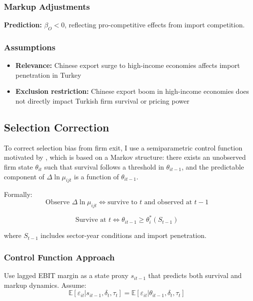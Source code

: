 \documentclass[12pt]{article}
\begin{document}
\subsubsection{Markup Adjustments}

\textbf{Prediction:} $\beta_O < 0$, reflecting pro-competitive effects from import competition.

\subsubsection{Assumptions}

\begin{itemize}
    \item \textbf{Relevance:} Chinese export surge to high-income economies affects import penetration in Turkey
    \item \textbf{Exclusion restriction:} Chinese export boom in high-income economies does not directly impact Turkish firm survival or pricing power
\end{itemize}

\subsection{Selection Correction}

To correct selection bias from firm exit, I use a semiparametric control function motivated by \autocite{backusWhyProductivityCorrelated2020}, which is based on a Markov structure: there exists an unobserved firm state $\theta_{it}$ such that survival follows a threshold in $\theta_{it-1}$, and the predictable component of $\Delta \ln \mu_{ijt}$ is a function of $\theta_{it-1}$.

Formally:
\[
\text{Observe } \Delta \ln \mu_{ijt} \Longleftrightarrow \text{survive to } t \text{ and observed at } t-1
\]

\[
\text{Survive at } t \Longleftrightarrow \theta_{it-1} \geq \theta_i^*(S_{t-1})
\]

where $S_{t-1}$ includes sector-year conditions and import penetration.

\subsubsection{Control Function Approach}

Use lagged EBIT margin as a state proxy $s_{it-1}$ that predicts both survival and markup dynamics. Assume:
\[
\mathbb{E}[\varepsilon_{it} | s_{it-1}, \delta_t, \tau_t] = \mathbb{E}[\varepsilon_{it} | \theta_{it-1}, \delta_t, \tau_t]
\]
\end{document}
